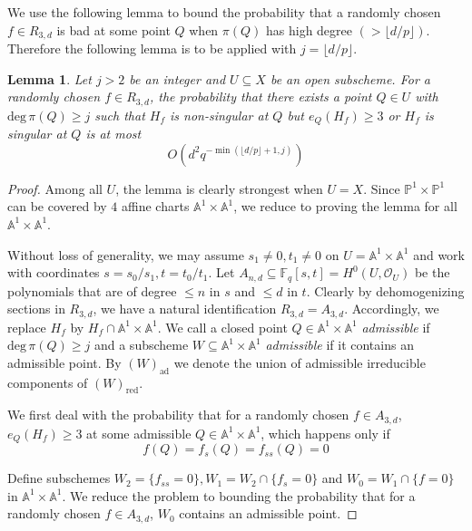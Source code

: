 \documentclass[12pt]{article}
\theoremstyle{plain}
\newtheorem{lemma}[equation]{Lemma}
\theoremstyle{definition}
\newcommand{\IA}{\mathbb{A}}
\newcommand{\IF}{\mathbb{F}}
\newcommand{\IP}{\mathbb{P}}
\newcommand{\sO}{\mathcal{O}}
\renewcommand{\deg}{\mathrm{deg}\,}
\newcommand{\<}{\langle}
\renewcommand{\>}{\rangle}
\begin{document}
We use the following lemma to bound the probability that a randomly chosen $f \in R_{3, d}$ is bad at some point $Q$ when $\pi(Q)$ has high degree $(> \lfloor d/p \rfloor)$. Therefore the following lemma is to be applied with $j = \lfloor d/p \rfloor$. 
\begin{lemma}
\label{prep}
Let $j > 2$ be an integer and $U \subseteq X$ be an open subscheme. For a randomly chosen $f \in R_{3, d}$, the probability that there exists a point $Q \in U$ with $\deg \pi(Q) \ge j$ such that $H_f$ is non-singular at $Q$ but $e_{Q}(H_f) \ge 3$ or $H_f$ is singular at $Q$ is at most 
$$ O(d^2 q^{- \min(\lfloor d/p \rfloor + 1, j)}) $$
\end{lemma}
\begin{proof}
Among all $U$, the lemma is clearly strongest when $U = X$. Since $\IP^1 \times \IP^1$ can be covered by $4$ affine charts $\IA^1 \times \IA^1$, we reduce to proving the lemma for all $\IA^1 \times \IA^1$.  

Without loss of generality, we may assume $s_1 \neq 0, t_1 \neq 0$ on $U = \IA^1 \times \IA^1$ and work with coordinates $s = s_0/s_1, t = t_0/t_1$. Let $A_{n, d} \subseteq \IF_q[s, t] = H^0(U, \sO_U)$ be the polynomials that are of degree $\le n$ in $s$ and $\le d$ in $t$. Clearly by dehomogenizing sections in $R_{3, d}$, we have a natural identification $R_{3, d} = A_{3, d}$. Accordingly, we replace $H_f$ by $H_f \cap \IA^1 \times \IA^1$. We call a closed point $Q \in \IA^1 \times \IA^1$ \textit{admissible} if $\deg \pi(Q) \ge j$ and a subscheme $W \subseteq \IA^1 \times \IA^1$ \textit{admissible} if it contains an admissible point. By $(W)_{\mathrm{ad}}$ we denote the union of admissible irreducible components of $(W)_{\mathrm{red}}$. 

We first deal with the probability that for a randomly chosen $f \in A_{3, d}$, $e_Q(H_f) \ge 3$ at some admissible $Q \in \IA^1 \times \IA^1$, which happens only if \begin{equation} \label{ramify} f(Q) = f_s(Q) = f_{ss}(Q) = 0 \end{equation}  

Define subschemes $W_2 = \{f_{ss} = 0 \}, W_1 = W_2 \cap \{ f_s = 0 \}$ and $W_0 = W_1 \cap \{ f = 0 \}$ in $\IA^1 \times \IA^1$. We reduce the problem to bounding the probability that for a randomly chosen $f \in A_{3, d}$, $W_0$ contains an admissible point.  


\end{proof}
\end{document}
